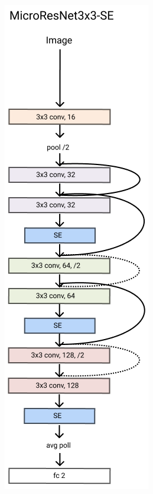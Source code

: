 \documentclass[../document.tex]{subfiles}
\begin{document}
\begin{figure}[htbp]
\begin{subfigure}[b]{0.22\textwidth}
        \caption{}
    \end{subfigure}
    \begin{subfigure}[b]{0.22\textwidth}
        \includegraphics[width=\textwidth]{../img/3/models/transparent-microresnet3x3-se.png}

\end{subfigure}
\end{figure}
\end{document}
